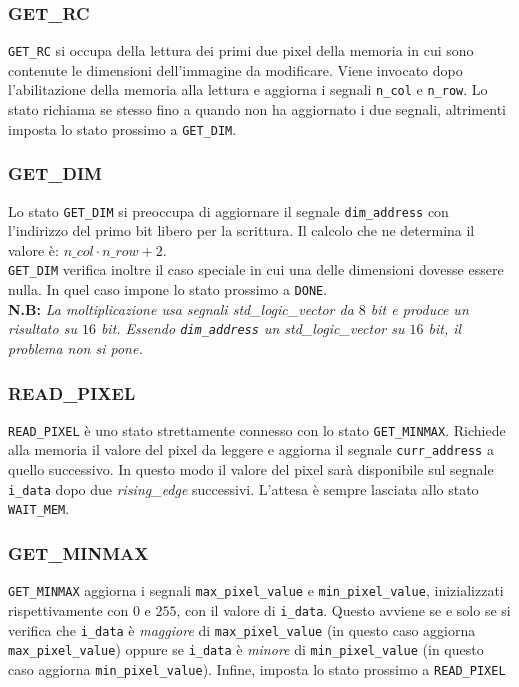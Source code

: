 \documentclass[11pt, a4paper]{article}
\begin{document}
\subsubsection{GET\_RC}
\texttt{GET\_RC} si occupa della lettura dei primi due pixel della memoria in cui sono contenute le dimensioni dell’immagine da modificare. Viene invocato dopo l'abilitazione della memoria alla lettura e aggiorna i segnali \texttt{n\_col} e \texttt{n\_row}. Lo stato richiama se stesso fino a quando non ha aggiornato i due segnali, altrimenti imposta lo stato prossimo a \texttt{GET\_DIM}.

\subsubsection{GET\_DIM}
Lo stato \texttt{GET\_DIM} si preoccupa di aggiornare il segnale \texttt{dim\_address} con l'indirizzo del primo bit libero per la scrittura. Il calcolo che ne determina il valore è: $n\_col \cdot n\_row + 2$.\\
\texttt{GET\_DIM} verifica inoltre il caso speciale in cui una delle dimensioni dovesse essere nulla. In quel caso impone lo stato prossimo a \texttt{DONE}.\\

\textbf{N.B:}\textit{
La moltiplicazione usa segnali \textit{std\_logic\_vector} da $8$ bit e produce un risultato su $16$ bit. Essendo \texttt{dim\_address} un \textit{std\_logic\_vector} su $16$ bit, il problema non si pone.
}

\subsubsection{READ\_PIXEL}
\texttt{READ\_PIXEL} è uno stato strettamente connesso con lo stato \texttt{GET\_MINMAX}. Richiede alla memoria il valore del pixel da leggere e aggiorna il segnale \texttt{curr\_address} a quello successivo. In questo modo il valore del pixel sarà disponibile sul segnale \texttt{i\_data} dopo due \textit{rising\_edge} successivi. L'attesa è sempre lasciata allo stato \texttt{WAIT\_MEM}.

\subsubsection{GET\_MINMAX}
\texttt{GET\_MINMAX} aggiorna i segnali \texttt{max\_pixel\_value} e \texttt{min\_pixel\_value}, inizializzati rispettivamente con $0$ e $255$, con il valore di \texttt{i\_data}. Questo avviene se e solo se si verifica che \texttt{i\_data} è \textit{maggiore} di \texttt{max\_pixel\_value} (in questo caso aggiorna \texttt{max\_pixel\_value}) oppure se \texttt{i\_data} è \textit{minore} di \texttt{min\_pixel\_value} (in questo caso aggiorna \texttt{min\_pixel\_value}). Infine, imposta lo stato prossimo a \texttt{READ\_PIXEL}
\end{document}

